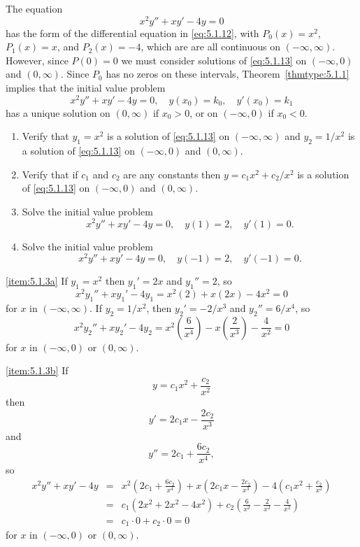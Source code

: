 \documentclass{ximera}
\begin{document}
\begin{example}\label{example:5.1.3} 
The equation
\begin{equation}\label{eq:5.1.13}
x^2y''+xy'-4y=0
\end{equation}
has the form of the differential equation in \eqref{eq:5.1.12}, with
$P_0(x)=x^2$, $P_1(x)=x$, and $P_2(x)=-4$, which are are all
continuous on $(-\infty,\infty)$. However, since $P(0)=0$ we must
consider solutions of \eqref{eq:5.1.13} on $(-\infty,0)$ and $(0,\infty)$.
Since $P_0$ has no zeros on these intervals, Theorem~\ref{thmtype:5.1.1}
implies that the initial value problem
$$
x^2y''+xy'-4y=0,\quad y(x_0)=k_0,\quad y'(x_0)=k_1
$$
has a unique solution on $(0,\infty)$ if $x_0>0$, or on $(-\infty,0)$
if $x_0<0$.
 
\begin{enumerate}
\item\label{item:5.1.3a}%
Verify that $y_1=x^2$ is a solution of \eqref{eq:5.1.13} on
$(-\infty,\infty)$ and $y_2=1/x^2$ is a solution of \eqref{eq:5.1.13}
on $(-\infty,0)$  and $(0,\infty)$.
\item\label{item:5.1.3b}%
Verify that if $c_1$ and $c_2$ are any constants then
$y=c_1x^2+c_2/x^2$ is a solution of \eqref{eq:5.1.13} on $(-\infty,0)$
and $(0,\infty)$.
\item\label{item:5.1.3c}%
Solve the initial value problem
\begin{equation}\label{eq:5.1.14}
x^2y''+xy'-4y=0,\quad y(1)=2,\quad y'(1)=0.
\end{equation}
\item\label{item:5.1.3d}%
Solve the initial value problem
\begin{equation}\label{eq:5.1.15}
x^2y''+xy'-4y=0,\quad y(-1)=2,\quad y'(-1)=0.
\end{equation}
\end{enumerate}
\begin{explanation}
\ref{item:5.1.3a} If $y_1=x^2$ then $y_1'=2x$ and $y_1''=2$, so
$$
x^2y_1''+xy_1'-4y_1=x^2(2)+x(2x)-4x^2=0
$$
for $x$ in $(-\infty,\infty)$.
If $y_2=1/x^2$, then $y_2'=-2/x^3$ and $y_2''=6/x^4$, so
$$
x^2y_2''+xy_2'-4y_2=x^2\left(\frac{6}{x^4}\right)-x\left(\frac{2}{x^3}\right)-{\frac{4}{x^2}}=0
$$
for $x$ in $(-\infty,0)$ or $(0,\infty)$.
 
\ref{item:5.1.3b} If
\begin{equation}\label{eq:5.1.16}
y=c_1x^2+\frac{c_2}{x^2}
\end{equation}
 then
\begin{equation}\label{eq:5.1.17}
y'=2c_1x-\frac{2c_2}{x^3}
\end{equation}
and
$$
y''=2c_1+\frac{6c_2}{x^4},
$$
so
\begin{eqnarray*}
x^2y''+xy'-4y&=&x^2\left(2c_1+\frac{6c_2}{x^4}\right)
+x\left(2c_1x-\frac{2c_2}{x^3}\right)
-4\left(c_1x^2+\frac{c_2}{x^2}\right)\\
&=&c_1(2x^2+2x^2-4x^2)
+c_2\left(\frac{6}{x^2}-\frac{2}{x^2}-\frac{4}{x^2}\right)
\\
&=&c_1\cdot0+c_2\cdot0=0
\end{eqnarray*}
for $x$ in $(-\infty,0)$ or $(0,\infty)$.
 

\end{explanation}
\end{example}
\end{document}
